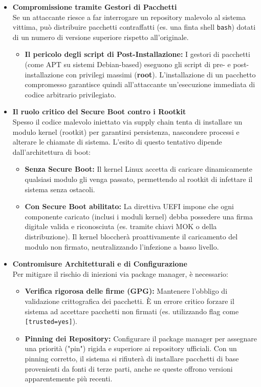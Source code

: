 \documentclass[12pt, a4paper]{report}
\begin{document}
\begin{itemize}
	\item \textbf{Compromissione tramite Gestori di Pacchetti}\\
	Se un attaccante riesce a far interrogare un repository malevolo al sistema vittima, può distribuire pacchetti contraffatti (es. una finta shell \texttt{bash}) dotati di un numero di versione superiore rispetto all'originale.
	\begin{itemize}
		\item \textbf{Il pericolo degli script di Post-Installazione:} I gestori di pacchetti (come APT su sistemi Debian-based) eseguono gli script di pre- e post-installazione con privilegi massimi (\textbf{root}). L'installazione di un pacchetto compromesso garantisce quindi all'attaccante un'esecuzione immediata di codice arbitrario privilegiato.
	\end{itemize}
	
	\item \textbf{Il ruolo critico del Secure Boot contro i Rootkit}\\
	Spesso il codice malevolo iniettato via supply chain tenta di installare un modulo kernel (rootkit) per garantirsi persistenza, nascondere processi e alterare le chiamate di sistema. L'esito di questo tentativo dipende dall'architettura di boot:
	\begin{itemize}
		\item \textbf{Senza Secure Boot:} Il kernel Linux accetta di caricare dinamicamente qualsiasi modulo gli venga passato, permettendo al rootkit di infettare il sistema senza ostacoli.
		\item \textbf{Con Secure Boot abilitato:} La direttiva UEFI impone che ogni componente caricato (inclusi i moduli kernel) debba possedere una firma digitale valida e riconosciuta (es. tramite chiavi MOK o della distribuzione). Il kernel bloccherà proattivamente il caricamento del modulo non firmato, neutralizzando l'infezione a basso livello.
	\end{itemize}
	
	\item \textbf{Contromisure Architetturali e di Configurazione}\\
	Per mitigare il rischio di iniezioni via package manager, è necessario:
	\begin{itemize}
		\item \textbf{Verifica rigorosa delle firme (GPG):} Mantenere l'obbligo di validazione crittografica dei pacchetti. È un errore critico forzare il sistema ad accettare pacchetti non firmati (es. utilizzando flag come \texttt{[trusted=yes]}).
		\item \textbf{Pinning dei Repository:} Configurare il package manager per assegnare una priorità ("pin") rigida e superiore ai repository ufficiali. Con un pinning corretto, il sistema si rifiuterà di installare pacchetti di base provenienti da fonti di terze parti, anche se queste offrono versioni apparentemente più recenti.
	\end{itemize}
\end{itemize}
\end{document}
